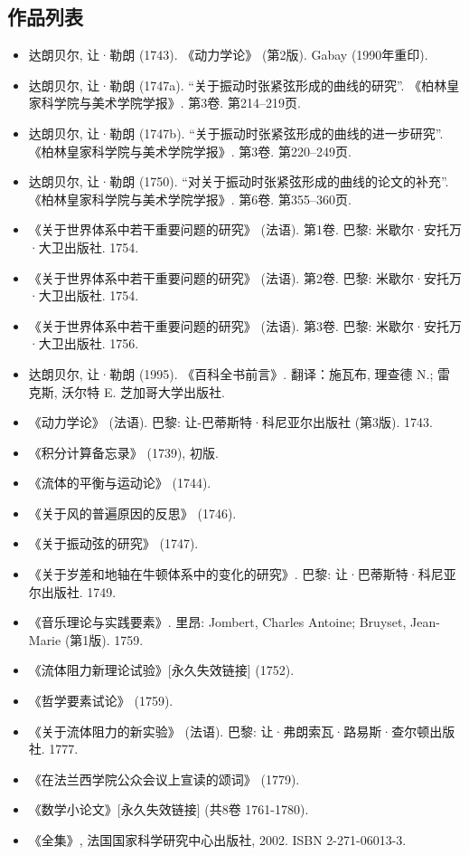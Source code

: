 \subsection{作品列表}
\begin{itemize}
\item 达朗贝尔, 让·勒朗 (1743). 《动力学论》 (第2版). Gabay (1990年重印).
\item 达朗贝尔, 让·勒朗 (1747a). “关于振动时张紧弦形成的曲线的研究”. 《柏林皇家科学院与美术学院学报》. 第3卷. 第214–219页.
\item 达朗贝尔, 让·勒朗 (1747b). “关于振动时张紧弦形成的曲线的进一步研究”. 《柏林皇家科学院与美术学院学报》. 第3卷. 第220–249页.
\item 达朗贝尔, 让·勒朗 (1750). “对关于振动时张紧弦形成的曲线的论文的补充”. 《柏林皇家科学院与美术学院学报》. 第6卷. 第355–360页.
\item 《关于世界体系中若干重要问题的研究》 (法语). 第1卷. 巴黎: 米歇尔·安托万·大卫出版社. 1754.
\item 《关于世界体系中若干重要问题的研究》 (法语). 第2卷. 巴黎: 米歇尔·安托万·大卫出版社. 1754.
\item 《关于世界体系中若干重要问题的研究》 (法语). 第3卷. 巴黎: 米歇尔·安托万·大卫出版社. 1756.
\item 达朗贝尔, 让·勒朗 (1995). 《百科全书前言》. 翻译：施瓦布, 理查德 N.; 雷克斯, 沃尔特 E. 芝加哥大学出版社.
\item 《动力学论》 (法语). 巴黎: 让-巴蒂斯特·科尼亚尔出版社 (第3版). 1743.
\item 《积分计算备忘录》 (1739), 初版.
\item 《流体的平衡与运动论》 (1744).
\item 《关于风的普遍原因的反思》 (1746).
\item 《关于振动弦的研究》 (1747).
\item 《关于岁差和地轴在牛顿体系中的变化的研究》. 巴黎: 让·巴蒂斯特·科尼亚尔出版社. 1749.
\item 《音乐理论与实践要素》. 里昂: Jombert, Charles Antoine; Bruyset, Jean-Marie (第1版). 1759.
\item 《流体阻力新理论试验》[永久失效链接] (1752).
\item 《哲学要素试论》 (1759).
\item 《关于流体阻力的新实验》 (法语). 巴黎: 让·弗朗索瓦·路易斯·查尔顿出版社. 1777.
\item 《在法兰西学院公众会议上宣读的颂词》 (1779).
\item 《数学小论文》[永久失效链接] (共8卷 1761-1780).
\item 《全集》, 法国国家科学研究中心出版社, 2002. ISBN 2-271-06013-3.

\end{itemize}
